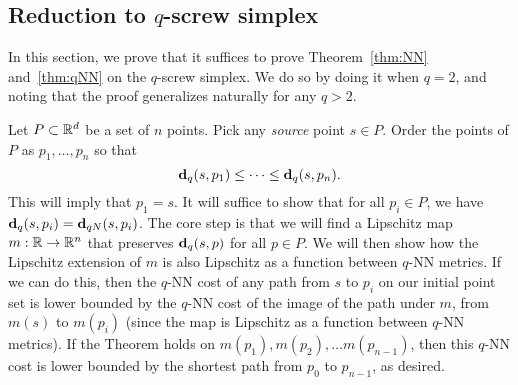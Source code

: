 \subsection{Reduction to $q$-screw simplex} %
\label{sec:reduction-to-screw}
In this section, we prove that it suffices to prove Theorem~\ref{thm:NN}
and~\ref{thm:qNN} on the $q$-screw simplex. We do so by doing it when
$q=2$, and noting that the proof generalizes naturally for any $q > 2$.

  Let $P\subset \mathbb{R}^d$ be a set of $n$ points.
  Pick any \emph{source} point $s\in P$.
  Order the points of $P$ as $p_1,\ldots ,p_n$ so that
  \[
    \mathbf{d}_q(s,p_1) \le \cdots \le \mathbf{d}_q(s, p_n).
  \]
  This will imply that $p_1 = s$.
  It will suffice to show that for all $p_i\in P$, we have $\mathbf{d}_q(s,p_i)
= \mathbf{d}_{qN}(s,p_i)$.
The core step is that we will find a Lipschitz map $m: \mathbb{R} \rightarrow \mathbb{R}^n$
that preserves $\mathbf{d}_q(s,p)$ for all $p \in P$. We will then show how the
Lipschitz extension of $m$ is also Lipschitz as a function between $q$-NN
metrics. If we can do this, then the $q$-NN cost of any path from $s$ to
$p_i$ on our initial point set is lower bounded by the $q$-NN cost of the
image of the path under $m$, from $m(s)$ to $m(p_i)$ (since the map is Lipschitz as a function
between $q$-NN metrics). If the Theorem holds on $m(p_1), m(p_2), \ldots
m(p_{n-1})$, then this $q$-NN cost is lower bounded by the shortest path
from $p_0$ to $p_{n-1}$, as desired.
  
  
  
  
